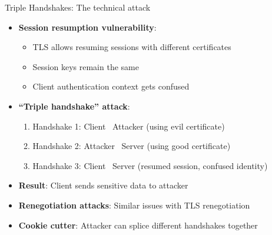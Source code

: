 \documentclass[aspectratio=169, lualatex, handout]{beamer}
\begin{document}
\begin{frame}{Triple Handshakes: The technical attack}
	\begin{itemize}
		\item \textbf{Session resumption vulnerability}:
		      \begin{itemize}
			      \item TLS allows resuming sessions with different certificates
			      \item Session keys remain the same
			      \item Client authentication context gets confused
		      \end{itemize}
		\item \textbf{``Triple handshake'' attack}:
		      \begin{enumerate}
			      \item Handshake 1: Client \leftarrow\ Attacker (using evil certificate)
			      \item Handshake 2: Attacker \leftarrow\ Server (using good certificate)
			      \item Handshake 3: Client \leftarrow\ Server (resumed session, confused identity)
		      \end{enumerate}
		\item \textbf{Result}: Client sends sensitive data to attacker
		\item \textbf{Renegotiation attacks}: Similar issues with TLS renegotiation
		\item \textbf{Cookie cutter}: Attacker can splice different handshakes together
	\end{itemize}
\end{frame}
\end{document}
